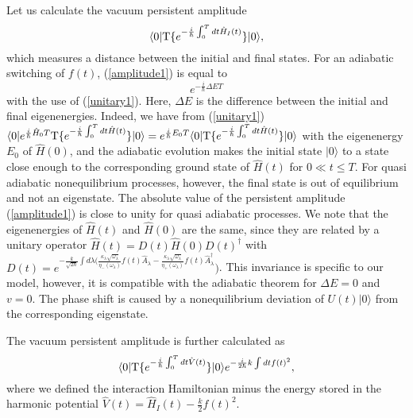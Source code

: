 \documentclass[aps,pre,twocolumn,eqsecnum,showpacs,superscriptaddress]{revtex4}
\begin{document}
Let us calculate the vacuum persistent amplitude\cite{Zuber1}
\begin{equation}
\langle 0|{\rm T}\{e^{-\frac{i}{\hbar}\int_0^T dt \hat{H}_I(t)}\}|0\rangle, \label{amplitude1}
\end{equation}
which measures a distance between the initial and final states.     
For an adiabatic switching of $f(t)$, (\ref{amplitude1}) is equal to 
\begin{equation}
e^{-\frac{i}{\hbar}\Delta E T} \label{amplitude2}
\end{equation} 
with the use of (\ref{unitary1}).
Here, $\Delta E$ is the difference between the initial and final eigenenergies. 
Indeed, we have from (\ref{unitary1}) $\langle 0|e^{\frac{i}{\hbar}\hat{H}_0 T}{\rm T}\{e^{-\frac{i}{\hbar}\int_0^T dt \hat{H}(t)}\}|0\rangle=e^{\frac{i}{\hbar}E_0 T}\langle 0|{\rm T}\{e^{-\frac{i}{\hbar}\int_0^T dt \hat{H}(t)}\}|0\rangle$ with the eigenenergy $E_0$ of $\hat{H}(0)$, and the adiabatic evolution makes the initial state $|0\rangle$ to a state close enough to the corresponding ground state of $\hat{H}(t)$ for $0\ll t\leq T$.
For quasi adiabatic nonequilibrium processes, however, the final state is out of equilibrium and not an eigenstate. 
The absolute value of the persistent amplitude (\ref{amplitude1}) is close to unity for quasi adiabatic processes. 
We note that the eigenenergies of $\hat{H}(t)$ and $\hat{H}(0)$ are the same, since they are related by a unitary operator $\hat{H}(t)=D(t)\hat{H}(0)D(t)^\dagger$ with $D(t)=e^{-\frac{k}{\sqrt{2\hbar}}\int d\lambda(\frac{\kappa_\lambda\sqrt{\omega_\lambda}}{\eta_-(\omega_\lambda)}f(t)\hat{A}_\lambda-\frac{\kappa_\lambda\sqrt{\omega_\lambda}}{\eta_+(\omega_\lambda)}f(t)\hat{A}_\lambda^\dagger})$. This invariance is specific to our model, however, it is compatible with the adiabatic theorem for $\Delta E=0$ and $v=0$.  The phase shift is caused by a nonequilibrium deviation of $U(t)|0\rangle$ from the corresponding eigenstate.  

The vacuum persistent amplitude is further calculated as
\begin{equation}
\langle 0|{\rm T}\{e^{-\frac{i}{\hbar}\int_0^T dt\hat{V}(t)}\}|0\rangle e^{-\frac{i}{2\hbar}k\int dt f(t)^2}, \label{amplitude3}
\end{equation}
where we defined the interaction Hamiltonian minus the energy stored in the harmonic potential $\hat{V}(t)=\hat{H}_I(t)-\frac{k}{2}f(t)^2$.
\end{document}
